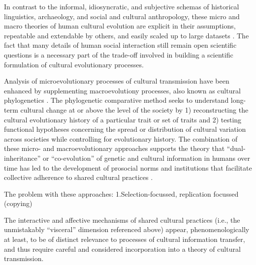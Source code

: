 In contrast to the informal, idiosyncratic, and subjective schemas of historical linguistics, archaeology, and social and cultural anthropology, these micro and macro theories of human cultural evolution are explicit in their assumptions, repeatable and extendable by others, and easily scaled up to large datasets \citep{Mesoudi2017}. The fact that many details of human social interaction still remain open scientific questions is a necessary part of the trade-off involved in building a scientific formulation of cultural evolutionary processes.

Analysis of microevolutionary processes of cultural transmission have been enhanced by supplementing macroevolutiony processes, also known as cultural phylogenetics \citep{Mace1994}.  The phylogenetic comparative method seeks to understand long-term cultural change at or above the level of the society by 1) reconstructing the cultural evolutionary history of a particular trait or set of traits and 2) testing functional hypotheses concerning the spread or distribution of cultural variation across societies while controlling for evolutionary history.  The combination of these micro- and macroevolutionary approaches supports the theory that  ``dual-inheritance'' or ``co-evolution'' of genetic and cultural information in humans over time has led to the development of prosocial norms and institutions that facilitate collective adherence to shared cultural practices \citep{Richerson2008,Chudek2011}.

The problem with these approaches:
1.Selection-focussed, replication focussed (copying)

The interactive and affective mechanisms of shared cultural practices (i.e., the unmistakably ``visceral'' dimension referenced above) appear, phenomenologically at least, to be of distinct relevance to processes of cultural information transfer, and thus require careful and considered incorporation into a theory of cultural transmission.



